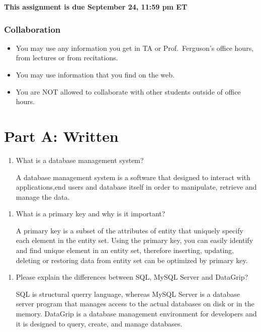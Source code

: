 \documentclass[11pt]{article}
\providecommand{\tightlist}{%
      \setlength{\itemsep}{0pt}\setlength{\parskip}{0pt}}
\begin{document}
\textbf{This assignment is due September 24, 11:59 pm ET}

\hypertarget{collaboration}{%
\subsubsection{Collaboration}\label{collaboration}}

\begin{itemize}
\tightlist
\item
  You may use any information you get in TA or Prof.~Ferguson's office
  hours, from lectures or from recitations.
\item
  You may use information that you find on the web.
\item
  You are NOT allowed to collaborate with other students outside of
  office hours.
\end{itemize}

    \hypertarget{part-a-written}{%
\section{Part A: Written}\label{part-a-written}}

    \begin{enumerate}
\def\labelenumi{\arabic{enumi}.}
\item
  What is a database management system?

  A database management system is a software that designed to interact
  with applications,end users and database itself in order to
  manipulate, retrieve and manage the data.
\end{enumerate}

    \begin{enumerate}
\def\labelenumi{\arabic{enumi}.}
\setcounter{enumi}{1}
\item
  What is a primary key and why is it important?

  A primary key is a subset of the attributes of entity that uniquely
  specify each element in the entity set. Using the primary key, you can
  easily identify and find unique element in an entity set, therefore
  inserting, updating, deleting or restoring data from entity set can be
  optimized by primary key.
\end{enumerate}

    \begin{enumerate}
\def\labelenumi{\arabic{enumi}.}
\setcounter{enumi}{2}
\item
  Please explain the differences between SQL, MySQL Server and DataGrip?

  SQL is structural querry language, whereas MySQL Server is a database
  server program that manages access to the actual databases on disk or
  in the memory. DataGrip is a database management environment for
  developers and it is designed to query, create, and manage databases.
\end{enumerate}
\end{document}
